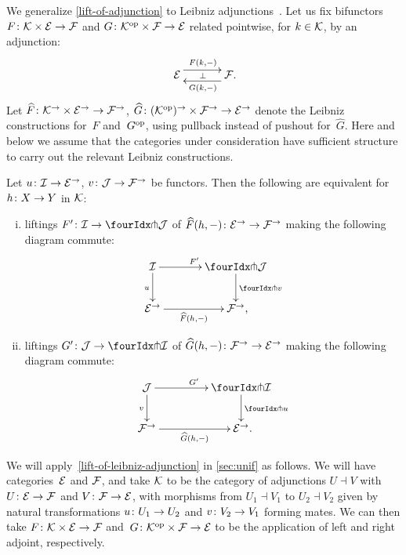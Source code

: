 \documentclass[reqno,10pt,a4paper,oneside,draft]{amsart}
\begin{document}
{{We generalize \cref{lift-of-adjunction} to Leibniz adjunctions~\cite{riehl-verity:reedy}.
Let us fix bifunctors $F \co \cal{K} \times \catE \to \cal{F}$ and $G \co \cal{K}^{\op} \times \cal{F} \to \catE$ related pointwise, for $k \in \cal{K}$, by an adjunction:
\[
\xymatrix@C+1em{
  \catE
  \ar@<5pt>[r]^{F(k, \arghole)}
  \ar@{}[r]|{\bot}
&
  \cal{F}
  \ar@<5pt>[l]^{G(k, \arghole)}
\rlap{.}}
\]
Let $ \widehat{F} \co \cal{K}^\to \times \catE^\to \to \cal{F}^\to$, 
$ \widehat{G} \co (\cal{K}^{\op})^\to \times \cal{F}^\to \to \catE^\to$
denote the Leibniz constructions for~$F$ and~$G^{\op}$, using pullback instead of pushout for~$\widehat{G}$.
Here and below we assume that the categories under consideration have sufficient structure to carry out
the relevant Leibniz constructions. 

\begin{proposition} \label{lift-of-leibniz-adjunction}
Let $u \co \cal{I} \to \catE^\to$, $v \co \cal{J} \to \cal{F}^\to$ be functors.
Then the following are equivalent for $h \co X \to Y$ in $\cal{K}$:
\begin{enumerate}[(i)]
\item liftings $F' \co \cal{I} \to \liftl{\cal{J}}$ of $\widehat{F}(h, \arghole) \co \catE^\to \to \cal{F}^\to$ making the following diagram commute:
\[
\xymatrix@C=1.2cm{
  \cal{I}
  \ar[r]^{F'}
  \ar[d]_{u}
&
  \liftl{\cal{J}}
  \ar[d]^{\liftl{v}}
\\
  \catE^\to
  \ar[r]_-{\widehat{F}(h, \arghole)}
&
  \cal{F}^\to
\rlap{,}}
\]
\item liftings $G' \co \cal{J} \to \liftr{\cal{I}}$ of $\widehat{G}(h, \arghole) \co \cal{F}^\to \to \catE^\to$ making the following diagram commute:
\[
\xymatrix@C+2em{
  \cal{J}
  \ar[d]_{v}
  \ar[r]^{G'}
&
  \liftr{\cal{I}}
  \ar[d]^{\liftr{u}}
\\
  \cal{F}^\to
  \ar[r]_-{\widehat{G}(h, \arghole)}
&
  \catE^\to
\rlap{.}}
\]
\end{enumerate}
\end{proposition}




\begin{remark} \label{pitchfork-leibniz-most-general-example} We will apply~\cref{lift-of-leibniz-adjunction} in \cref{sec:unif}
as follows. We will have categories~$\cal{E}$ and $\cal{F}$, and take $\cal{K}$ to be the category of adjunctions 
$U \dashv V$ with $U \co \catE \to \cal{F}$ and $V \co \cal{F} \to \catE$, with morphisms from $U_1 \dashv V_1$ to $U_2 \dashv V_2$ 
given by natural transformations $u \co U_1 \to U_2$ and $v \co V_2 \to V_1$ forming mates. We can then take 
$F \co \cal{K} \times \catE \to \cal{F}$ and~$G \co \cal{K}^{\op} \times \cal{F} \to \catE$ to be the 
application of left and right adjoint, respectively.
 \end{remark}


}}
\end{document}
